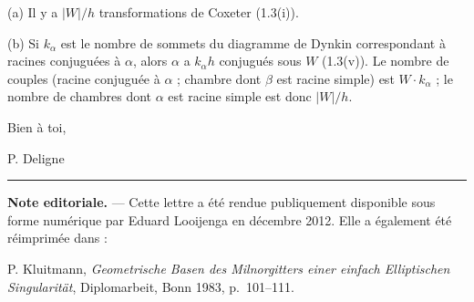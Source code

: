 \documentclass[11pt,a4paper]{article}
\theoremstyle{plain}
\theoremstyle{definition}
\begin{document}
\smallskip

(a) Il y a $|W|/h$ transformations de Coxeter (1.3(i)).

\smallskip

(b) Si $k_\alpha$ est le nombre de sommets du diagramme de Dynkin correspondant \`a racines conjugu\'ees \`a $\alpha$, alors $\alpha$ a $k_\alpha h$ conjugu\'es sous $W$ (1.3(v)). Le nombre de couples (racine conjugu\'ee \`a $\alpha$ ; chambre dont $\beta$ est racine simple) est $W \cdot k_\alpha$ ; le nombre de chambres dont $\alpha$ est racine simple est donc $|W|/h$.

\vspace{1cm}

\begin{flushright}
Bien \`a toi,

\vspace{0.3cm}
P. Deligne
\end{flushright}

\vspace{1cm}

\noindent\rule{\textwidth}{0.4pt}

\vspace{0.3cm}

\noindent
\textbf{Note editoriale.} --- Cette lettre a \'et\'e rendue publiquement disponible sous forme num\'erique par Eduard Looijenga en d\'ecembre 2012. Elle a \'egalement \'et\'e r\'eimprim\'ee dans :

P. Kluitmann, \textit{Geometrische Basen des Milnorgitters einer einfach Elliptischen Singularit\"at}, Diplomarbeit, Bonn 1983, p.~101--111.
\end{document}
